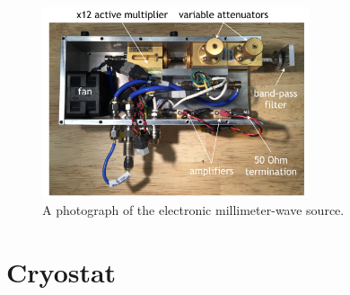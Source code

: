 \begin{figure}[htb]
\centering
\includegraphics[width=0.7\textwidth]{hardware/millimeter-wave_source_annotated.png}
\caption[A photograph of the electronic millimeter-wave source.]
{
A photograph of the electronic millimeter-wave source.
}
\label{fig:millimeter-wave_source_annotated}
\end{figure}

\clearpage

\section{Cryostat}
\label{sec:hardware.cryostat}

